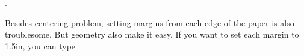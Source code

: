 \begin{teX}
\usepackage[text={7in,10in},centering]{geometry}.
\end{teX}

Besides centering problem, setting margins from each edge of the paper is also troublesome. But geometry
also make it easy. If you want to set each margin to 1.5in, you can type

